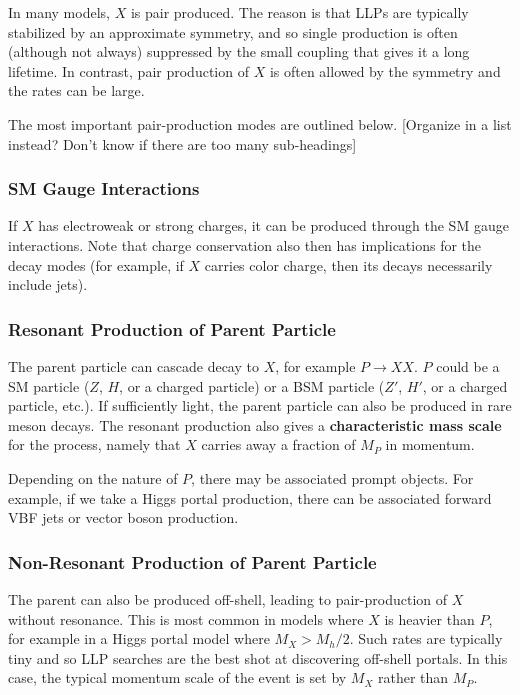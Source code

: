 In many models, $X$ is pair produced. The reason is that LLPs are typically stabilized by an approximate symmetry, and so single production is often (although not always) suppressed by the small coupling that gives it a long lifetime. In contrast, pair production of $X$ is often allowed by the symmetry and the rates can be large.

The most important pair-production modes are outlined below. [Organize in a list instead? Don't know if there are too many sub-headings]

\subsubsection{SM Gauge Interactions}

If $X$ has electroweak or strong charges, it can be produced through the SM gauge interactions. Note that charge conservation also then has implications for the decay modes (for example, if $X$ carries color charge, then its decays necessarily include jets).

\subsubsection{Resonant Production of Parent Particle}

The parent particle can cascade decay to $X$, for example $P\rightarrow XX$. $P$ could be a SM particle ($Z$, $H$, or a charged particle) or a BSM particle ($Z'$, $H'$, or a charged particle, etc.). If sufficiently light, the parent particle can also be produced in rare meson decays. The resonant production also gives a {\bf characteristic mass scale} for the process, namely that $X$ carries away a fraction of $M_P$ in momentum.

Depending on the nature of $P$, there may be associated prompt objects. For example, if we take a Higgs portal production, there can be associated forward VBF jets or vector boson production.

\subsubsection{Non-Resonant Production of Parent Particle}

The parent can also be produced off-shell, leading to pair-production of $X$ without resonance. This is most common in models where $X$ is heavier than $P$, for example in a Higgs portal model where $M_X > M_h/2$. Such rates are typically tiny and so LLP searches are the best shot at discovering off-shell portals. In this case, the typical momentum scale of the event is set by $M_X$ rather than $M_P$.

